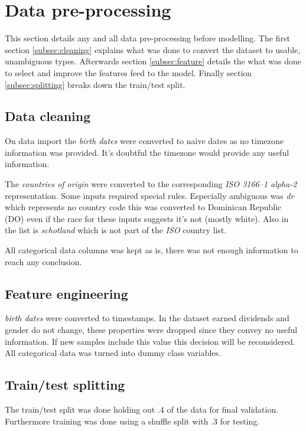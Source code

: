 \section{Data pre-processing}
\label{sec:data}

This section details any and all data pre-processing before modelling.
The first section \vref{subsec:cleaning} explains what was done to
convert the dataset to usable, unambiguous types.
Afterwards section \vref{subsec:feature} details the what was
done to select and improve the features feed to the model.
Finally section \vref{subsec:splitting} breaks down the train/test split.


\subsection{Data cleaning}
\label{subsec:cleaning}

On data import the \emph{birth dates} were converted to naive dates as no
timezone information was provided.
It's doubtful the timezone would provide any useful information.

The \emph{countries of origin} were converted
to the corresponding \emph{ISO 3166--1 alpha-2} representation.
Some inputs required special rules.
Especially ambiguous was \emph{dr} which
represents no country code this was converted to Dominican Republic (DO)
even if the race for these inputs suggests it's not (mostly white).
Also in the list is \emph{schotland} which is not part of the \emph{ISO}
country list.

All categorical data columns was kept as is, there was not enough information
to reach any conclusion.


\subsection{Feature engineering}
\label{subsec:feature}

\emph{birth dates} were converted to timestamps.
In the dataset earned dividends and gender do not change,
these properties were dropped since they convey no useful information.
If new samples include this value this decision will be reconsidered.
All categorical data was turned into dummy class variables.


\subsection{Train/test splitting}
\label{subsec:splitting}

The train/test split was done holding out .4 of the data for final
validation.
Furthermore training was done using a shuffle split with .3 for testing.

